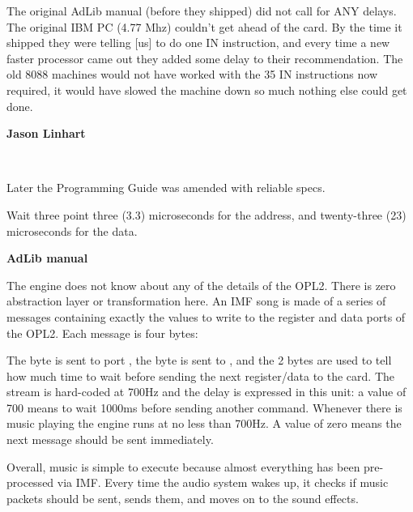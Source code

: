 \begin{fancyquotes}
The original AdLib manual (before they shipped) did not call for ANY delays. The original IBM PC (4.77 Mhz) couldn't get ahead of the card. By the time it shipped they were telling [us] to do one IN instruction, and every time a new faster processor came out they added some delay to their recommendation. The old 8088 machines would not have worked with the 35 IN instructions now required, it would have slowed the machine down so much nothing else could get done\footnotemark.\\
 \par
 \textbf{Jason Linhart}
 \end{fancyquotes}
\\
\par
Later the Programming Guide was amended with reliable specs.\\
\par
\begin{fancyquotes}
Wait three point three (3.3) microseconds for the address, and twenty-three (23) microseconds for the data.\\
\par
\textbf{AdLib manual}
 \end{fancyquotes}
 

\par
The engine does not know about any of the details of the OPL2. There is zero abstraction layer or transformation here. An IMF song is made of a series of messages containing exactly the values to write to the register and data ports of the OPL2. Each message is four bytes:\\
\par
\begin{minipage}{\textwidth}

\end{minipage}
\par
The  byte is sent to port , the  byte is sent to , and the  2 bytes are used to tell how much time to wait before sending the next register/data to the card. The stream is hard-coded at 700Hz and the delay is expressed in this unit: a value of 700 means to wait 1000ms before sending another command. Whenever there is music playing the engine runs at no less than 700Hz. A value of zero means the next message should be sent immediately.\\
\par
Overall, music is simple to execute because almost everything has been pre-processed via IMF. Every time the audio system wakes up, it checks if music packets should be sent, sends them, and moves on to the sound effects.










